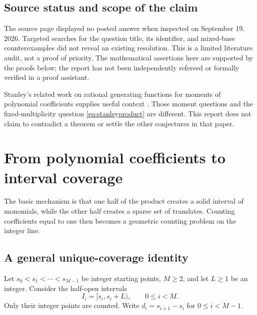 \documentclass[11pt,letterpaper]{article}
\numberwithin{equation}{section}
\theoremstyle{definition}
\theoremstyle{remark}
\begin{document}
\subsection{Source status and scope of the claim}
The source page displayed no posted answer when inspected on September 19,
2026. Targeted searches for the question title, its identifier, and mixed-base
counterexamples did not reveal an existing resolution. This is a limited
literature audit, not a proof of priority. The mathematical assertions here
are supported by the proofs below; the report has not been independently
refereed or formally verified in a proof assistant.

Stanley's related work on rational generating functions for moments of
polynomial coefficients supplies useful context \cite{StanleyRational}.
Those moment questions and the fixed-multiplicity question
\eqref{eq:stanleyproduct} are different. This report does not claim to
contradict a theorem or settle the other conjectures in that paper.

\section{From polynomial coefficients to interval coverage}\label{sec:intervals}

The basic mechanism is that one half of the product creates a solid interval
of monomials, while the other half creates a sparse set of translates.
Counting coefficients equal to one then becomes a geometric counting problem
on the integer line.

\subsection{A general unique-coverage identity}
Let $s_0<s_1<\cdots<s_{M-1}$ be integer starting points, $M\ge2$, and let
$L\ge1$ be an integer. Consider the half-open intervals
\[
 I_i=[s_i,s_i+L),\qquad 0\le i<M.
\]
Only their integer points are counted. Write
$d_i=s_{i+1}-s_i$ for $0\le i<M-1$.
\end{document}
